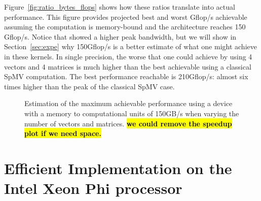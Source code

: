 \documentclass[10pt,conference,compsocconf]{IEEEtran}
\newcommand{\todo}[1]{{\color{red}\textbf{\hl{#1}}\xspace}}
\begin{document}
Figure~\ref{fig:ratio_bytes_flops} shows how these ratios translate
into actual performance. This figure provides projected best and worst
Gflop/s achievable assuming the computation is memory-bound and the
architecture reaches 150 Gflop/s. Notice that \cite{Saule13-ARXIV}
showed a higher peak bandwidth, but we will show in
Section~\ref{sec:expe} why 150Gflop/s is a better estimate of what one
might achieve in these kernels. In single precision, the worse that
one could achieve by using 4 vectors and 4 matrices is much higher
than the best achievable using a classical SpMV computation. The best
performance reachable is 210Gflop/s: almost six times higher than the
peak of the classical SpMV case. 


\begin{figure}
  \centering 
%
  
  \caption{Estimation of the maximum achievable performance 
    using a device with a memory to computational units of 150GB/s
    when varying the number of vectors and matrices. \todo{we could
      remove the speedup plot if we need space.}}
  \label{fig:perf_predict}
\end{figure}

\section{Efficient Implementation on the Intel Xeon Phi processor}
\label{sec:impl}
\end{document}
